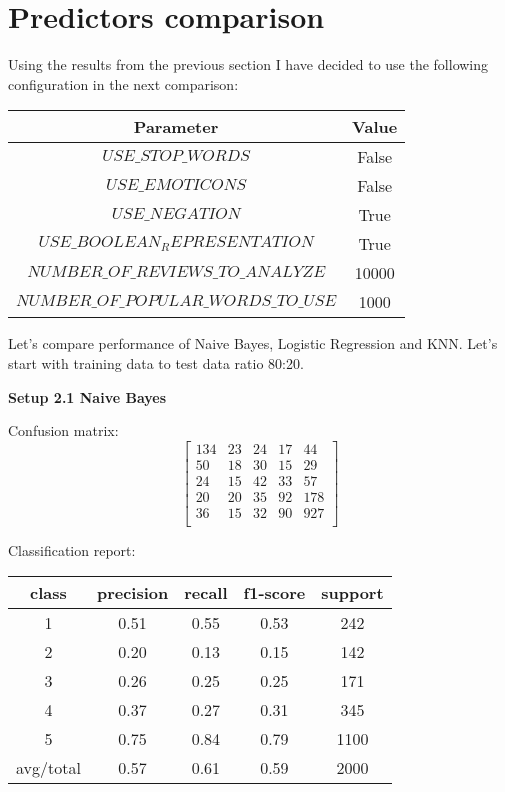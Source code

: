 \documentclass[12pt]{report}
\begin{document}
\newpage


\section{Predictors comparison}

Using the results from the previous section I have decided to use the following configuration in the next comparison:

\begin{center}
	\begin{tabular}{ c | c }
		\hline
		Parameter & Value \\ \hline
		$USE\_STOP\_WORDS$ & False \\ \hline
		$USE\_EMOTICONS$ & False \\ \hline
		$USE\_NEGATION$ & True \\ \hline
		$USE\_BOOLEAN_REPRESENTATION$ & True \\ \hline
		$NUMBER\_OF\_REVIEWS\_TO\_ANALYZE$ & 10000 \\ \hline
		$NUMBER\_OF\_POPULAR\_WORDS\_TO\_USE$ & 1000 \\ \hline
	\end{tabular}
\end{center}

Let’s compare performance of Naive Bayes, Logistic Regression and KNN.
Let's start with training data to test data ratio 80:20.

\bigbreak

\textbf{Setup 2.1 Naive Bayes}

Confusion matrix:
\[
\begin{bmatrix}
134 & 23 & 24 & 17 & 44 \\
50 & 18 & 30 & 15 & 29 \\
24 & 15 & 42 & 33 & 57 \\
20 & 20 & 35 & 92 & 178 \\
36 & 15 & 32 & 90 & 927 \\
\end{bmatrix}
\]

Classification report:

\begin{center}
	\begin{tabular}{c | c | c | c | c }
		\hline
		class & precision & recall & f1-score & support \\ \hline
		1 & 0.51 & 0.55 & 0.53 & 242 \\ \hline
		2 & 0.20 & 0.13 & 0.15 & 142 \\ \hline
		3 & 0.26 & 0.25 & 0.25 & 171 \\ \hline
		4 & 0.37 & 0.27 & 0.31 & 345 \\ \hline
		5 & 0.75 & 0.84 & 0.79 & 1100 \\ \hline
		avg/total & 0.57 & 0.61 & 0.59 & 2000 \\ \hline
	\end{tabular}
\end{center}
\end{document}
